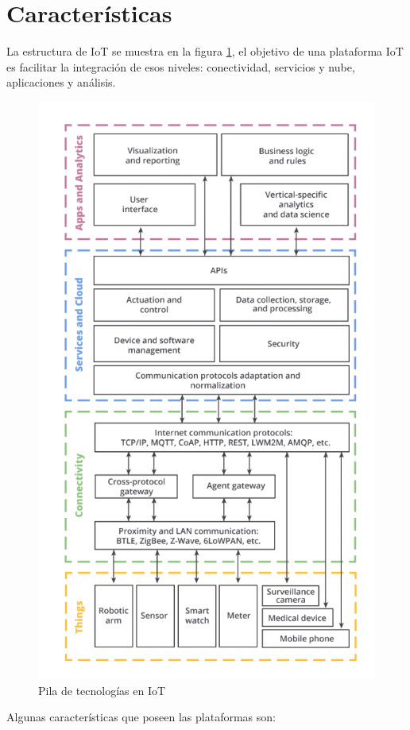 \documentclass[12pt, twoside]{book}
\begin{document}
\section{Características}
La estructura de IoT se muestra en la figura \ref{stack_iot}, el objetivo de una plataforma IoT es facilitar la integración de esos niveles: conectividad, servicios y nube, aplicaciones y análisis.
\begin{figure}[H]
\centering
\includegraphics[scale=0.4]{images/iot_stack}
\caption{Pila de tecnologías en IoT}\label{stack_iot}
\end{figure}
Algunas características que poseen las plataformas son:
\end{document}
